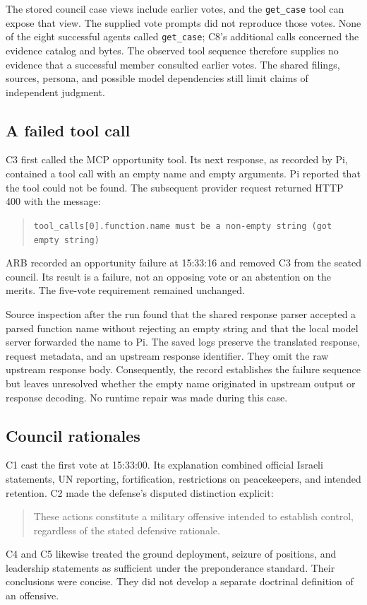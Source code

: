 \documentclass[11pt]{article}
\newcommand{\code}[1]{\texttt{#1}}
\begin{document}
The stored council case views include earlier votes, and the \code{get\_case} tool can expose that view.  The supplied vote prompts did not reproduce those votes.  None of the eight successful agents called \code{get\_case}; C8's additional calls concerned the evidence catalog and bytes.  The observed tool sequence therefore supplies no evidence that a successful member consulted earlier votes.  The shared filings, sources, persona, and possible model dependencies still limit claims of independent judgment.

\subsection{A failed tool call}

C3 first called the MCP opportunity tool.  Its next response, as recorded by Pi, contained a tool call with an empty name and empty arguments.  Pi reported that the tool could not be found.  The subsequent provider request returned HTTP 400 with the message:
\begin{quote}
\small
\code{tool\_calls[0].function.name must be a non-empty string (got empty string)}
\end{quote}
ARB recorded an opportunity failure at 15:33:16 and removed C3 from the seated council.  Its result is a failure, not an opposing vote or an abstention on the merits.  The five-vote requirement remained unchanged.

Source inspection after the run found that the shared response parser accepted a parsed function name without rejecting an empty string and that the local model server forwarded the name to Pi.  The saved logs preserve the translated response, request metadata, and an upstream response identifier.  They omit the raw upstream response body.  Consequently, the record establishes the failure sequence but leaves unresolved whether the empty name originated in upstream output or response decoding.  No runtime repair was made during this case.

\subsection{Council rationales}

C1 cast the first vote at 15:33:00.  Its explanation combined official Israeli statements, UN reporting, fortification, restrictions on peacekeepers, and intended retention.  C2 made the defense's disputed distinction explicit:
\begin{quote}
These actions constitute a military offensive intended to establish control, regardless of the stated defensive rationale.
\end{quote}
C4 and C5 likewise treated the ground deployment, seizure of positions, and leadership statements as sufficient under the preponderance standard.  Their conclusions were concise.  They did not develop a separate doctrinal definition of an offensive.
\end{document}
